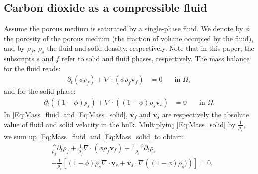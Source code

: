 \subsection{Carbon dioxide as a compressible fluid} \label{Sec:CO2}
Assume the porous medium is saturated by a single-phase fluid. We denote by $\phi$ the porosity of the porous medium (the fraction of volume occupied by the fluid), and by $\rho_f,~\rho_s$ the fluid and solid density, respectively. Note that in this paper, the subscripts $s$  and $f$ refer to solid and fluid phases, respectively. The mass balance for the fluid reads:
\begin{equation}\label{Eq:Mass_fluid}
    \begin{aligned}
        \partial_t\left(\phi\rho_f\right)  +\nabla\cdot\left(\phi\rho_f \mathbf{v}_f\right)&=0  \quad  &\text{in~} \Omega,
    \end{aligned}
\end{equation}
and for the solid phase:
\begin{equation}\label{Eq:Mass_solid}
\begin{aligned}
\partial_t\left(\left(1- \phi\right) \rho_s\right) + \nabla\cdot\left(\left(1- \phi\right)\rho_s \mathbf{v}_s\right)&=0  \quad  &\text{in~} \Omega.
\end{aligned}
\end{equation}
In \eqref{Eq:Mass_fluid} and \eqref{Eq:Mass_solid}, $\mathbf{v}_f$ and $\mathbf{v}_s$ are respectively the absolute value of fluid and solid velocity in the bulk.
Multiplying \eqref{Eq:Mass_solid} by $\frac{1}{\rho_s}$, we sum up \eqref{Eq:Mass_fluid} and \eqref{Eq:Mass_solid} to obtain:
\begin{equation*}\label{Eq:Mass_sum}
	\begin{aligned}
	&\frac{\phi}{\rho_f}\partial_t\rho_f+\frac{1}{\rho_f}\nabla\cdot\left(\phi\rho_f \mathbf{v}_f\right)+\frac{1-\phi}{\rho_s}\partial_t\rho_s\\
	&+\frac{1}{\rho_s}\left[(1-\phi)\rho_s \nabla \cdot \mathbf{v}_s+\mathbf{v}_s \cdot \nabla \left((1-\phi)\rho_s)\right)\right]=0.
	\end{aligned}
\end{equation*}
